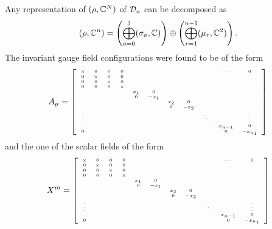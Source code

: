         Any representation of $(\rho,\mathbb{C}^N)$ of $\mathcal{D}_n$ can be decomposed as
        \begin{equation}
            (\rho,\mathbb{C}^n) = \left( \bigoplus^3_{a=0}(\sigma_a,\mathbb{C}) \right)\oplus\left( \bigoplus^{n-1}_{r=1}(\mu_r,\mathbb{C}^2) \right).
        \end{equation}
        The invariant gauge field configurations were found to be of the form
        \begin{equation}
            A_\mu=
            {\tiny
            \left[
            \begin{array}{*{20}c}
                \times & 0 & 0 & 0 & & & & & & \cdots & 0 \\
                0 & \times & 0 & 0 & & & & & & & \\
                0 & 0 & \times & 0 & & & & & & & \\
                0 & 0 & 0 & \times & & & & & & & \\
                & & & & x_1 & 0 & & & & & \\
                & & & & 0 & -x_1 & & & & & \\
                & & & & & & x_2 & 0 & & & \\
                & & & & & & 0 & -x_2 & & & \\
                \vdots & & & & & & & & \ddots & & \vdots \\
                & & & & & & & & & x_{n-1} & 0 \\
                0 & & & & & & & & & 0 & -x_{n_1}
        \end{array}
        \right]}\label{eq:invformAmuDn}
        \end{equation}
        and the one of the scalar fields of the form
        \begin{equation}
            X^m=
            {\tiny
            \left[
            \begin{array}{*{20}c}
                \times & 0 & 0 & 0 & & & & & & \cdots & 0 \\
                0 & \times & 0 & 0 & & & & & & & \\
                0 & 0 & \times & 0 & & & & & & & \\
                0 & 0 & 0 & \times & & & & & & & \\
                & & & & x_1 & 0 & & & & & \\
                & & & & 0 & -x_1 & & & & & \\
                & & & & & & x_2 & 0 & & & \\
                & & & & & & 0 & -x_2 & & & \\
                \vdots & & & & & & & & \ddots & & \vdots \\
                & & & & & & & & & x_{n-1} & 0 \\
                0 & & & & & & & & & 0 & -x_{n_1}
        \end{array}
        \right]}\label{eq:invformXmDn}
        \end{equation}
